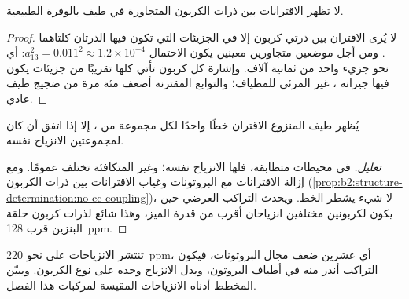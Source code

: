 \begin{proposition}\label{prop:b2:structure-determination:no-cc-coupling}
لا تظهر الاقترانات بين ذرات الكربون المتجاورة في طيف  بالوفرة
الطبيعية.
\end{proposition}

\begin{proof}
لا يُرى الاقتران بين ذرتي كربون إلا في الجزيئات التي تكون فيها الذرتان كلتاهما . ومن أجل موضعين
متجاورين معينين يكون الاحتمال $a_{13}^2 = 0.011^2 \approx 1.2 \times 10^{-4}$: أي نحو
جزيء واحد من ثمانية آلاف. وإشارة كل كربون تأتي كلها تقريبًا من جزيئات يكون فيها
جيرانه ، غير المرئي للمطياف؛ والتوابع المقترنة أضعف مئة مرة
من ضجيج طيف عادي.
\end{proof}

\begin{proposition}\label{prop:b2:structure-determination:signals}
يُظهر طيف  المنزوع الاقتران خطًا واحدًا لكل مجموعة من ، إلا إذا اتفق أن
كان لمجموعتين الانزياح نفسه.
\end{proposition}

\begin{proof}[تعليل]
 في محيطات متطابقة، فلها الانزياح نفسه؛ وغير المتكافئة
تختلف عمومًا. ومع إزالة الاقترانات مع البروتونات وغياب الاقترانات بين ذرات الكربون
(\cref{prop:b2:structure-determination:no-cc-coupling})، لا شيء يشطر الخط. ويحدث التراكب العرضي
حين يكون لكربونين مختلفين انزياحان أقرب من قدرة الميز، وهذا شائع
لذرات كربون حلقة البنزين قرب \qty{128}{ppm}.
\end{proof}

تنتشر الانزياحات على نحو \qty{220}{ppm}، أي عشرين ضعف مجال البروتونات، فيكون التراكب أندر منه
في أطياف البروتون، ويدل الانزياح وحده على نوع الكربون. ويبيّن المخطط أدناه الانزياحات
المقيسة لمركبات هذا الفصل.

